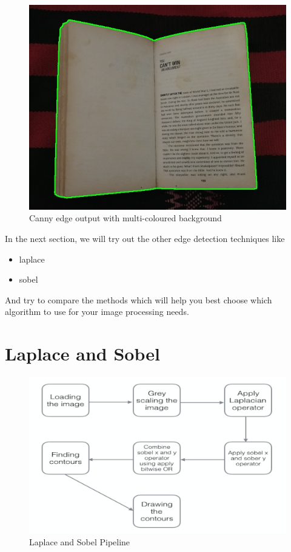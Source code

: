 \documentclass[BTech]{srmuthesis}
\begin{document}
\begin{figure}[h!]
    \centering
    \includegraphics[width=15cm\textwidth]{canny-edge-out2}
    \caption{Canny edge output with multi-coloured background}
    \label{fig:Canny edge output with multi-coloured background}
\end{figure}

In the next section, we will try out the other edge detection techniques like

\begin{itemize}
    \item laplace
    \item sobel
\end{itemize}

And try to compare the methods which will help you best choose which algorithm to use for your image processing needs.

\newpage

\section{Laplace and Sobel}

\begin{figure}[h]
    \centering
    \includegraphics[width=17cm\textwidth]{laplace_and_sobel_pipeline}
    \caption{Laplace and Sobel Pipeline}
    \label{fig:laplace_and_sobel_pipeline}
\end{figure}
\end{document}
